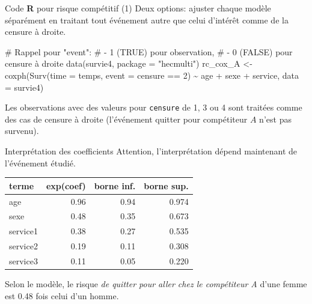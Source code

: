 \documentclass[
  ignorenonframetext,
]{beamer}
\newenvironment{Shaded}{\begin{snugshade}}{\end{snugshade}}
\newcommand{\AttributeTok}[1]{\textcolor[rgb]{0.40,0.45,0.13}{#1}}
\newcommand{\CommentTok}[1]{\textcolor[rgb]{0.37,0.37,0.37}{#1}}
\newcommand{\DecValTok}[1]{\textcolor[rgb]{0.68,0.00,0.00}{#1}}
\newcommand{\FunctionTok}[1]{\textcolor[rgb]{0.28,0.35,0.67}{#1}}
\newcommand{\NormalTok}[1]{\textcolor[rgb]{0.00,0.23,0.31}{#1}}
\newcommand{\OtherTok}[1]{\textcolor[rgb]{0.00,0.23,0.31}{#1}}
\newcommand{\SpecialCharTok}[1]{\textcolor[rgb]{0.37,0.37,0.37}{#1}}
\newcommand{\StringTok}[1]{\textcolor[rgb]{0.13,0.47,0.30}{#1}}
\begin{document}
\begin{frame}[fragile]{Code \textbf{R} pour risque compétitif (1)}
\protect\hypertarget{code-r-pour-risque-compuxe9titif-1}{}
Deux options: ajuster chaque modèle séparément en traitant tout
événement autre que celui d'intérêt comme de la censure à droite.

\begin{Shaded}
\begin{Highlighting}[numbers=left,,]
\CommentTok{\# Rappel pour "event":}
\CommentTok{\#  {-} 1 (TRUE) pour observation, }
\CommentTok{\#  {-} 0 (FALSE) pour censure à droite}
\FunctionTok{data}\NormalTok{(survie4, }\AttributeTok{package =} \StringTok{"hecmulti"}\NormalTok{)}
\NormalTok{rc\_cox\_A }\OtherTok{\textless{}{-}} \FunctionTok{coxph}\NormalTok{(}\FunctionTok{Surv}\NormalTok{(}\AttributeTok{time =}\NormalTok{ temps, }
                   \AttributeTok{event =}\NormalTok{ censure }\SpecialCharTok{==} \DecValTok{2}\NormalTok{) }\SpecialCharTok{\textasciitilde{}} 
\NormalTok{                age }\SpecialCharTok{+}\NormalTok{ sexe }\SpecialCharTok{+}\NormalTok{ service, }
              \AttributeTok{data =}\NormalTok{ survie4)}
\end{Highlighting}
\end{Shaded}

\footnotesize

Les observations avec des valeurs pour \texttt{censure} de 1, 3 ou 4
sont traitées comme des cas de censure à droite (l'événement quitter
pour compétiteur \(A\) n'est pas survenu).

\normalsize
\end{frame}

\begin{frame}{Interprétation des coefficients}
\protect\hypertarget{interpruxe9tation-des-coefficients}{}
Attention, l'interprétation dépend maintenant de l'événement étudié.

\begin{table}
\centering
\begin{tabular}{lrrr}
\toprule
terme & exp(coef) & borne inf. & borne sup.\\
\midrule
age & 0.96 & 0.94 & 0.974\\
sexe & 0.48 & 0.35 & 0.673\\
service1 & 0.38 & 0.27 & 0.535\\
service2 & 0.19 & 0.11 & 0.308\\
service3 & 0.11 & 0.05 & 0.220\\
\bottomrule
\end{tabular}
\end{table}

Selon le modèle, le risque \emph{de quitter pour aller chez le
compétiteur A} d'une femme est 0.48 fois celui d'un homme.
\end{frame}
\end{document}
